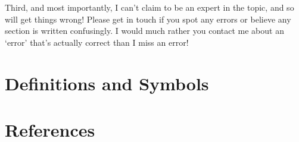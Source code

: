 \documentclass[a4paper,11pt]{report}
\begin{document}
\begin{sloppypar}
Third, and most importantly, I can't claim to be an expert in the topic, and so will get things wrong! Please get in touch if you spot any errors or believe any section is written confusingly. I would much rather you contact me about an `error' that's actually correct than I miss an error!













\chapter*{Definitions and Symbols}

\chapter*{References}

\printbibliography[heading=none]

\end{sloppypar}
\end{document}
